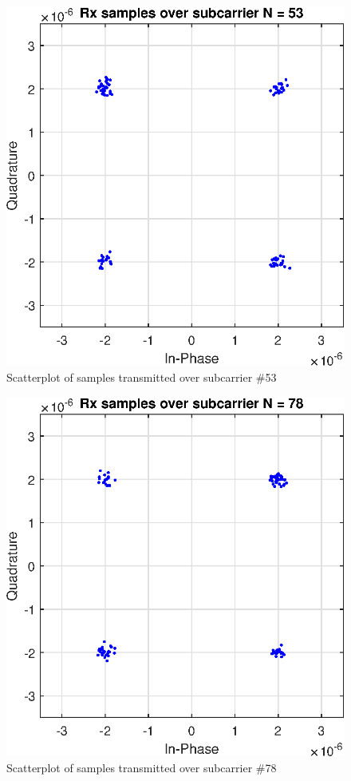 \documentclass[conference]{IEEEtran}
\begin{document}
\begin{appendices}
\begin{figure}[H]
    \centering
    \includegraphics[width=\linewidth]{images/AWGNN53.eps}
    \caption{Scatterplot of samples transmitted over subcarrier \#53}
    \label{AWGN53}
\end{figure}

\begin{figure}[H]
    \centering
    \includegraphics[width=\linewidth]{images/AWGNN78.eps}
    \caption{Scatterplot of samples transmitted over subcarrier \#78}
    \label{AWGN78}
\end{figure}


\end{appendices}
\end{document}
